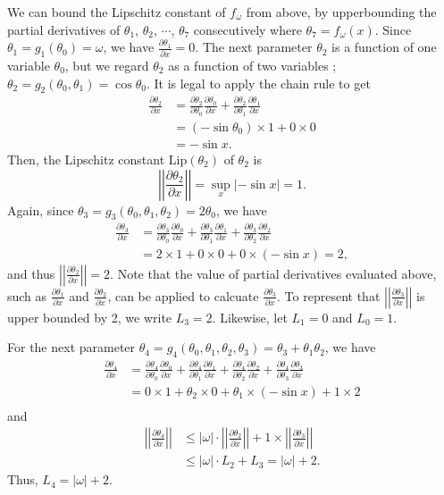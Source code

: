 \documentclass[11pt]{report}
\newcommand\lip{\ensuremath{\text{Lip}}}
\newcommand\pa[2]{\ensuremath{\frac{\partial #1}{\partial #2}}}
\newcommand\norm[1]{\ensuremath{\left|\left|#1\right|\right|}}
\begin{document}
We can bound the Lipschitz constant of \(f_\omega\) from above, by upperbounding the partial derivatives of \(\theta_1\), \(\theta_2\), \(\cdots\), \(\theta_7\) consecutively where \(\theta_7=f_\omega(x)\).
Since \(\theta_1=g_1(\theta_0)=\omega\), we have \(\frac{\partial\theta_1}{\partial x}=0\).
The next parameter \(\theta_2\) is a function of one variable \(\theta_0\), but we regard \(\theta_2\) as a function of two variables ; \(\theta_2=g_2(\theta_0,\theta_1)=\cos\theta_0\).
It is legal to apply the chain rule to get
\begin{align*}
\pa{\theta_2}x
&=\pa{\theta_2}{\theta_0}\pa{\theta_0}x+\pa{\theta_2}{\theta_1}\pa{\theta_1}x\\
&=(-\sin\theta_0)\times1+0\times0\\
&=-\sin x.
\end{align*}
Then, the Lipschitz constant \(\lip(\theta_2)\) of \(\theta_2\) is
\[\norm{\pa{\theta_2}x}=\sup_x|-\sin x|=1.\]
Again, since \(\theta_3=g_3(\theta_0,\theta_1,\theta_2)=2\theta_0\), we have
\begin{align*}
\pa{\theta_3}x
&=\pa{\theta_3}{\theta_0}\pa{\theta_0}x+\pa{\theta_3}{\theta_1}\pa{\theta_1}x+\pa{\theta_3}{\theta_2}\pa{\theta_2}x\\
&=2\times1+0\times0+0\times(-\sin x)=2,
\end{align*}
and thus \(\norm{\pa{\theta_2}x}=2\).
Note that the value of partial derivatives evaluated above, such as \pa{\theta_1}x and \pa{\theta_2}x, can be applied to calcuate \pa{\theta_3}x.
To represent that \norm{\pa{\theta_3}x} is upper bounded by 2, we write \(L_3=2\).
Likewise, let \(L_1=0\) and \(L_0=1\).

For the next parameter \(\theta_4=g_4(\theta_0,\theta_1,\theta_2,\theta_3)=\theta_3+\theta_1\theta_2\), we have
\begin{align*}
\pa{\theta_4}x
&=\pa{\theta_4}{\theta_0}\pa{\theta_0}x+\pa{\theta_4}{\theta_1}\pa{\theta_1}x+\pa{\theta_4}{\theta_2}\pa{\theta_2}x
+\pa{\theta_4}{\theta_3}\pa{\theta_3}x\\
&=0\times1+\theta_2\times0+\theta_1\times(-\sin x)+1\times2\\
\end{align*}
and
\begin{align*}
\norm{\pa{\theta_4}x}
&\le|\omega|\cdot\norm{\pa{\theta_2}x}+1\times\norm{\pa{\theta_3}x}\\
&\le|\omega|\cdot L_2+L_3=|\omega|+2.
\end{align*}
Thus, \(L_4=|\omega|+2\).
\end{document}
